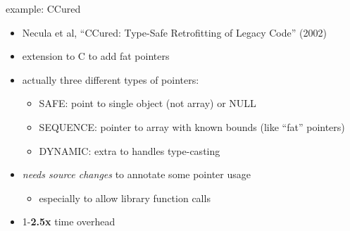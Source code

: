 \begin{frame}{example: CCured}
\begin{itemize}
\item Necula et al, ``CCured:  Type-Safe Retrofitting of Legacy Code'' (2002)
\vspace{.5cm}
\item extension to C to add fat pointers
\item actually three different types of pointers:   
    \begin{itemize}
    \item SAFE: point to single object (not array) or NULL
    \item SEQUENCE: pointer to array with known bounds (like ``fat'' pointers)
    \item DYNAMIC: extra to handles type-casting
    \end{itemize}
\item \textit{needs source changes} to annotate some pointer usage
    \begin{itemize}
    \item especially to allow library function calls
    \end{itemize}
\item 1-\textbf{2.5x} time overhead
\end{itemize}
\end{frame}
